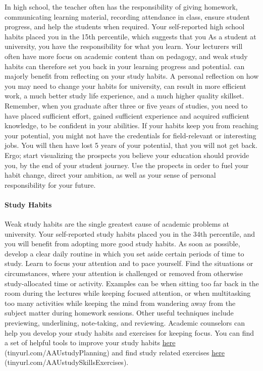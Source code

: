 \documentclass[]{article}
\let\oldparagraph\paragraph
\renewcommand{\paragraph}[1]{\oldparagraph{#1}\mbox{}}
\begin{document}
In high school, the teacher often has the responsibility of giving
homework, communicating learning material, recording attendance in
class, ensure student progress, and help the students when required.
Your self-reported high school habits placed you in the 15th percentile,
which suggests that you As a student at university, you have the
responsibility for what you learn. Your lecturers will often have more
focus on academic content than on pedagogy, and weak study habits can
therefore set you back in your learning progress and potential. can
majorly benefit from reflecting on your study habits. A personal
reflection on how you may need to change your habits for university, can
result in more efficient work, a much better study life experience, and
a much higher quality skillset. Remember, when you graduate after three
or five years of studies, you need to have placed sufficient effort,
gained sufficient experience and acquired sufficient knowledge, to be
confident in your abilities. If your habits keep you from reaching your
potential, you might not have the credentials for field-relevant or
interesting jobs. You will then have lost 5 years of your potential,
that you will not get back. Ergo; start visualizing the prospects you
believe your education should provide you, by the end of your student
journey. Use the propects in order to fuel your habit change, direct
your ambition, as well as your sense of personal responsibility for your
future.

\paragraph{Study Habits}\label{study-habits}

Weak study habits are the single greatest cause of academic problems at
university. Your self-reported study habits placed you in the 34th
percentile, and you will benefit from adopting more good study habits.
As soon as possible, develop a clear daily routine in which you set
aside certain periods of time to study. Learn to focus your attention
and to pace yourself. Find the situations or circumstances, where your
attention is challenged or removed from otherwise study-allocated time
or activity. Examples can be when sitting too far back in the room
during the lectures while keeping focused attention, or when
multitasking too many activities while keeping the mind from wandering
away from the subject matter during homework sessions. Other useful
techniques include previewing, underlining, note-taking, and reviewing.
Academic counselors can help you develop your study habits and exercises
for keeping focus. You can find a set of helpful tools to improve your
study habits \href{tinyurl.com/AAUstudyPlanning}{here}
(tinyurl.com/AAUstudyPlanning) and find study related exercises
\href{tinyurl.com/AAUstudySkillsExercises}{here}
(tinyurl.com/AAUstudySkillsExercises).
\end{document}
